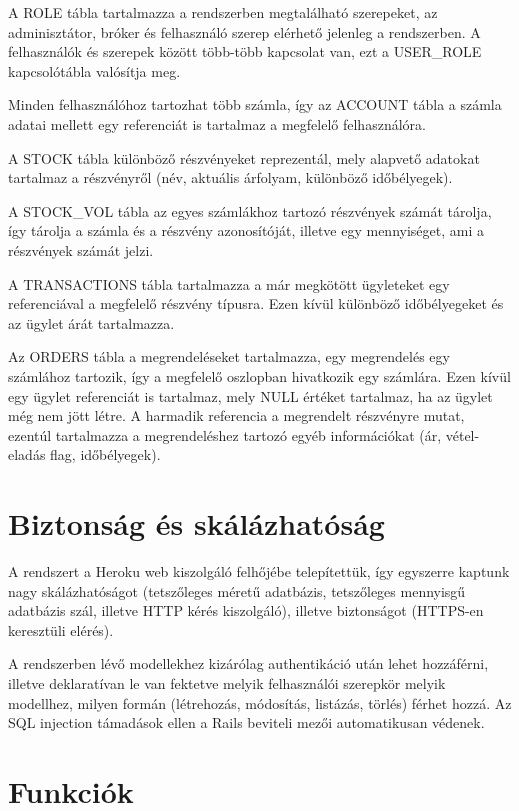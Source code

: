 A ROLE tábla tartalmazza a rendszerben megtalálható szerepeket, az adminisztátor, bróker és felhasználó szerep elérhető jelenleg a rendszerben. A felhasználók és szerepek között több-több kapcsolat van, ezt a USER\_ROLE kapcsolótábla valósítja meg. 

Minden felhasználóhoz tartozhat több számla, így az ACCOUNT tábla a számla adatai mellett egy referenciát is tartalmaz a megfelelő felhasználóra.

A STOCK tábla különböző részvényeket reprezentál, mely alapvető adatokat tartalmaz a részvényről (név, aktuális árfolyam, különböző időbélyegek).

A STOCK\_VOL tábla az egyes számlákhoz tartozó részvények számát tárolja, így tárolja a számla és a részvény azonosítóját, illetve egy mennyiséget, ami a részvények számát jelzi.

A TRANSACTIONS tábla tartalmazza a már megkötött ügyleteket egy referenciával a megfelelő részvény típusra. Ezen kívül különböző időbélyegeket és az ügylet árát tartalmazza.

Az ORDERS tábla a megrendeléseket tartalmazza, egy megrendelés egy számlához tartozik, így a megfelelő oszlopban hivatkozik egy számlára. Ezen kívül egy ügylet referenciát is tartalmaz, mely NULL értéket tartalmaz, ha az ügylet még nem jött létre. A harmadik referencia a megrendelt részvényre mutat, ezentúl tartalmazza a megrendeléshez tartozó egyéb információkat (ár, vétel-eladás flag, időbélyegek).

\section{Biztonság és skálázhatóság}\label{sect:rsz_funkciok}
A rendszert a Heroku web kiszolgáló felhőjébe telepítettük, így egyszerre kaptunk nagy skálázhatóságot (tetszőleges méretű adatbázis, tetszőleges mennyisgű adatbázis szál, illetve HTTP kérés kiszolgáló), illetve biztonságot (HTTPS-en keresztüli elérés).

A rendszerben lévő modellekhez kizárólag authentikáció után lehet hozzáférni, illetve deklaratívan le van fektetve melyik felhasználói szerepkör melyik modellhez, milyen formán (létrehozás, módosítás, listázás, törlés) férhet hozzá. Az SQL injection támadások ellen a Rails beviteli mezői automatikusan védenek.

\section{Funkciók}\label{sect:rsz_funkciok}
